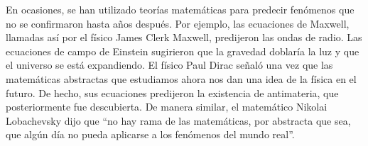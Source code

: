 \documentclass{article}
\begin{document}
En ocasiones, se han utilizado teorías matemáticas para predecir fenómenos que
no se confirmaron hasta años después. Por ejemplo, las ecuaciones de Maxwell,
llamadas así por el físico James Clerk Maxwell, predijeron las ondas de radio.
Las ecuaciones de campo de Einstein sugirieron que la gravedad doblaría la luz y
que el universo se está expandiendo. El físico Paul Dirac señaló una vez que las
matemáticas abstractas que estudiamos ahora nos dan una idea de la física en el
futuro. De hecho, sus ecuaciones predijeron la existencia de antimateria, que
posteriormente fue descubierta. De manera similar, el matemático Nikolai
Lobachevsky dijo que “no hay rama de las matemáticas, por abstracta que sea, que
algún día no pueda aplicarse a los fenómenos del mundo real”.

\pagebreak
 

\end{document}
